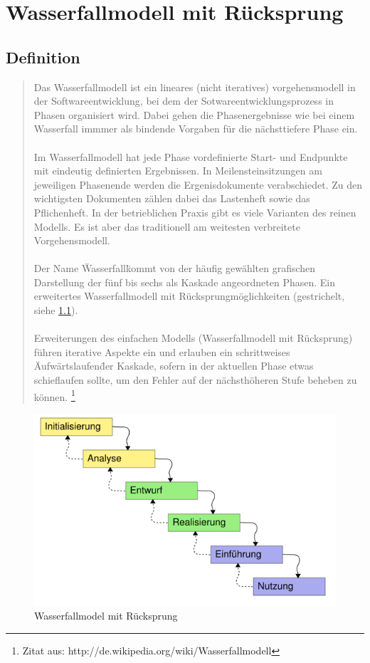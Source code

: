 \chapter{Wasserfallmodell mit Rücksprung}
\section{Definition}
\begin{quote}
Das Wasserfallmodell ist ein lineares (nicht iteratives) vorgehensmodell in der Softwareentwicklung, bei dem der
 Sotwareentwicklungsprozess in Phasen organisiert wird. Dabei gehen die Phasenergebnisse wie bei einem Wasserfall immmer
als bindende Vorgaben für die nächsttiefere Phase ein.\ \\ \\
Im Wasserfallmodell hat jede Phase vordefinierte Start- und Endpunkte mit eindeutig definierten Ergebnissen.
In Meilensteinsitzungen am jeweiligen Phasenende werden die Ergenisdokumente verabschiedet. Zu den wichtigsten
Dokumenten zählen dabei das Lastenheft sowie das Pflichenheft. In der betrieblichen Praxis gibt es viele Varianten
des reinen Modells. Es ist aber das traditionell am weitesten verbreitete Vorgehensmodell.\ \\ \\
Der Name \"Wasserfall\" kommt von der häufig gewählten grafischen Darstellung der fünf bis sechs als Kaskade
angeordneten Phasen. Ein erweitertes Wasserfallmodell mit Rücksprungmöglichkeiten (gestrichelt, siehe \ref{w_model}).\ \\ \\
Erweiterungen des einfachen Modells (Wasserfallmodell mit Rücksprung) führen iterative Aspekte ein und erlauben
ein schrittweises \"Aufwärtslaufen\" der Kaskade, sofern in der aktuellen Phase etwas schieflaufen sollte,
um den Fehler auf der nächsthöheren Stufe beheben zu können.
\footnote{Zitat aus:  http://de.wikipedia.org/wiki/Wasserfallmodell}
\end{quote}
\begin{figure}[h]
\centering
\includegraphics[width=\textwidth]{567px-Wasserfallmodell.png}
\caption{Wasserfallmodel mit Rücksprung}
\label{w_model}
\end{figure}


